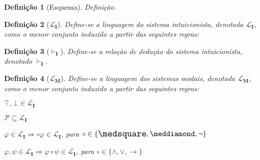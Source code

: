 \documentclass{report}
\newtheorem{definition}{Definição}
\begin{document}
    \begin{definition}[Esquema]
        Definição.
    \end{definition}


    \begin{definition}[$\mathcal{L}_\mathbf{I}$]
        Define-se a linguagem do sistema intuicionista, denotada $\mathcal{L}_\mathbf{I}$, como o menor conjunto induzido a partir das seguintes regras:
    \end{definition}

    \begin{definition}[$\vdash_\mathbf{I}$]
        Define-se a relação de dedução do sistema intuicionista, denotado $\vdash_\mathbf{I}$.
    \end{definition}


    \begin{definition}[$\mathcal{L}_\mathbf{M}$]
        Define-se a linguagem dos sistemas modais, denotada $\mathcal{L}_\mathbf{M}$, como o menor conjunto induzido a partir das seguintes regras:
        
        $\top, \bot \in \mathcal{L}_\mathbf{I}$
        
        $\mathcal{P} \subseteq \mathcal{L}_\mathbf{I}$
        
        $\varphi \in \mathcal{L}_\mathbf{I} \Rightarrow \circ \varphi \in \mathcal{L}_\mathbf{I}$, para $\circ \in \{\nec, \pos, \neg\}$

        $\varphi, \psi \in \mathcal{L}_\mathbf{I} \Rightarrow \varphi \circ \psi \in \mathcal{L}_\mathbf{I}$, para $\circ \in \{\wedge, \vee, \to\}$
    \end{definition}
\end{document}
